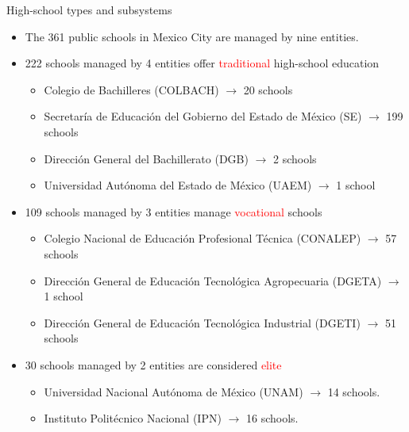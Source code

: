 \documentclass[notes,11pt, aspectratio=169]{beamer}
\begin{document}
\begin{frame}[fragile]{High-school types and subsystems}
  \begin{itemize}
    \vfill\item The 361 public schools in Mexico City are managed by nine entities.
    
\vfill\item 222 schools managed by 4 entities offer \textcolor{red}{traditional} high-school education 
  \begin{itemize}
\vfill\item Colegio de Bachilleres (COLBACH) $\rightarrow$ 20 schools
\vfill\item Secretaría de Educación del
Gobierno del Estado de México (SE) $\rightarrow$ 199 schools
\vfill\item Dirección General del Bachillerato (DGB) $\rightarrow$ 2 schools
\vfill\item Universidad Autónoma del Estado de México (UAEM) $\rightarrow$ 1 school
  \end{itemize}  
    \vfill\item 109 schools managed by 3 entities manage \textcolor{red}{vocational} schools
  \begin{itemize}
\vfill\item Colegio Nacional de Educación Profesional Técnica (CONALEP) $\rightarrow$ 57 schools
\vfill\item Dirección General de Educación Tecnológica Agropecuaria (DGETA)  $\rightarrow$ 1 school
\vfill\item Dirección General de Educación Tecnológica Industrial (DGETI)  $\rightarrow$ 51 schools
  \end{itemize}  

    \vfill\item 30 schools managed by 2 entities are considered \textcolor{red}{elite}
      \begin{itemize}
    \vfill\item Universidad Nacional Autónoma de México (UNAM) $\rightarrow$ 14  schools. 
    \vfill\item Instituto Politécnico Nacional (IPN) $\rightarrow$ 16 schools.
  \end{itemize} 

    
  \end{itemize}
\end{frame}
\end{document}
